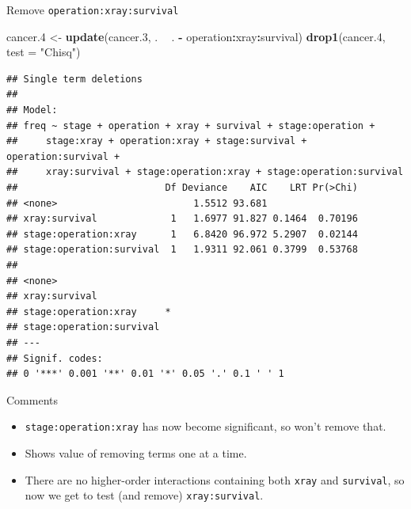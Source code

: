 \documentclass[ignorenonframetext,]{beamer}
\newenvironment{Shaded}{\begin{snugshade}}{\end{snugshade}}
\newcommand{\DataTypeTok}[1]{\textcolor[rgb]{0.13,0.29,0.53}{#1}}
\newcommand{\FloatTok}[1]{\textcolor[rgb]{0.00,0.00,0.81}{#1}}
\newcommand{\KeywordTok}[1]{\textcolor[rgb]{0.13,0.29,0.53}{\textbf{#1}}}
\newcommand{\NormalTok}[1]{#1}
\newcommand{\OperatorTok}[1]{\textcolor[rgb]{0.81,0.36,0.00}{\textbf{#1}}}
\newcommand{\StringTok}[1]{\textcolor[rgb]{0.31,0.60,0.02}{#1}}
\begin{document}
\begin{frame}[fragile]{Remove \texttt{operation:xray:survival}}
\protect\hypertarget{remove-operationxraysurvival}{}

\begin{Shaded}
\begin{Highlighting}[]
\NormalTok{cancer}\FloatTok{.4}\NormalTok{ <-}\StringTok{ }\KeywordTok{update}\NormalTok{(cancer}\FloatTok{.3}\NormalTok{, . }\OperatorTok{~}\StringTok{ }\NormalTok{. }\OperatorTok{-}\StringTok{ }\NormalTok{operation}\OperatorTok{:}\NormalTok{xray}\OperatorTok{:}\NormalTok{survival)}
\KeywordTok{drop1}\NormalTok{(cancer}\FloatTok{.4}\NormalTok{, }\DataTypeTok{test =} \StringTok{"Chisq"}\NormalTok{)}
\end{Highlighting}
\end{Shaded}

\begin{verbatim}
## Single term deletions
## 
## Model:
## freq ~ stage + operation + xray + survival + stage:operation + 
##     stage:xray + operation:xray + stage:survival + operation:survival + 
##     xray:survival + stage:operation:xray + stage:operation:survival
##                          Df Deviance    AIC    LRT Pr(>Chi)
## <none>                        1.5512 93.681                
## xray:survival             1   1.6977 91.827 0.1464  0.70196
## stage:operation:xray      1   6.8420 96.972 5.2907  0.02144
## stage:operation:survival  1   1.9311 92.061 0.3799  0.53768
##                           
## <none>                    
## xray:survival             
## stage:operation:xray     *
## stage:operation:survival  
## ---
## Signif. codes:  
## 0 '***' 0.001 '**' 0.01 '*' 0.05 '.' 0.1 ' ' 1
\end{verbatim}

\end{frame}

\begin{frame}[fragile]{Comments}
\protect\hypertarget{comments-31}{}

\begin{itemize}
\item
  \texttt{stage:operation:xray} has now become significant, so won't
  remove that.
\item
  Shows value of removing terms one at a time.
\item
  There are no higher-order interactions containing both \texttt{xray}
  and \texttt{survival}, so now we get to test (and remove)
  \texttt{xray:survival}.
\end{itemize}

\end{frame}
\end{document}
